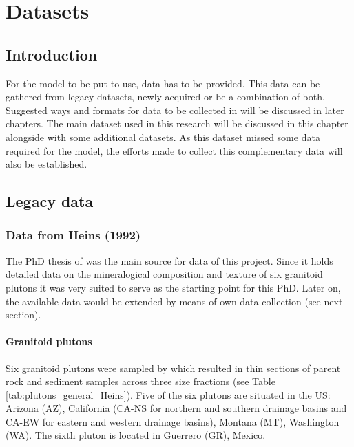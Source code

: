 \chapter{Datasets}\label{ch:datasets}


\section{Introduction}
For the model to be put to use, data has to be provided. %
This data can be gathered from legacy datasets, newly acquired or be a combination of both. %
Suggested ways and formats for data to be collected in will be discussed in later chapters. %
The main dataset used in this research will be discussed in this chapter alongside with some additional datasets. %
As this dataset missed some data required for the model, the efforts made to collect this complementary data will also be established. %


\section{Legacy data}
    \subsection{Data from Heins (1992)}
    The PhD thesis of \Textcite{Heins_1992} was the main source for data of this project. %
    Since it holds detailed data on the mineralogical composition and texture of six granitoid plutons it was very suited to serve as the starting point for this PhD. %
    Later on, the available data would be extended by means of own data collection (see next section). %

        \subsubsection{Granitoid plutons}
        Six granitoid plutons were sampled by \Textcite{Heins_1992} which resulted in  thin sections of parent rock and  sediment samples across three size fractions (see Table \ref{tab:plutons_general_Heins}). %
        Five of the six plutons are situated in the US: Arizona (AZ), California (CA-NS for northern and southern drainage basins and CA-EW for eastern and western drainage basins), Montana (MT), Washington (WA). %
        The sixth pluton is located in Guerrero (GR), Mexico. %

            

